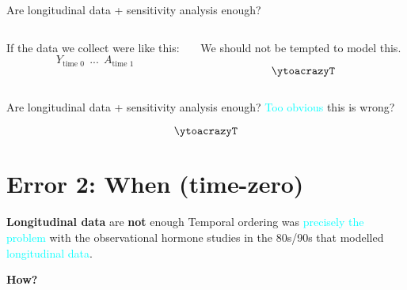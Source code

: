 \documentclass[
  ignorenonframetext,
  aspectratio=169,
  xcolor=\{dvipsnames\}]{beamer}
\begin{document}
\begin{frame}{Are longitudinal data + sensitivity analysis enough?}
\label{are-longitudinal-data-sensitivity-analysis-enough}
\begin{columns}[T]
\begin{column}{0.5\linewidth}
If the data we collect were like this:
\[Y_{\text{time 0}} ~~...~~ A_{\text{time 1}}\]
\end{column}

\begin{column}{0.5\linewidth}
We should not be tempted to model this.

\[\ytoacrazyT\]
\end{column}
\end{columns}
\end{frame}

\begin{frame}{Are longitudinal data + sensitivity analysis enough?}
\label{are-longitudinal-data-sensitivity-analysis-enough-1}
\textcolor{cyan}{Too obvious} this is wrong?

\[\ytoacrazyT\]
\end{frame}

\section{Error 2: When (time-zero)}\label{error-2-when-time-zero}

\begin{frame}{\textbf{Longitudinal data} are \textbf{not} enough}
\label{longitudinal-data-are-not-enough}
Temporal ordering was \textcolor{cyan}{precisely the problem} with the
observational hormone studies in the 80s/90s that modelled
\textcolor{cyan}{longitudinal data}.

\textbf{How?}
\end{frame}
\end{document}
